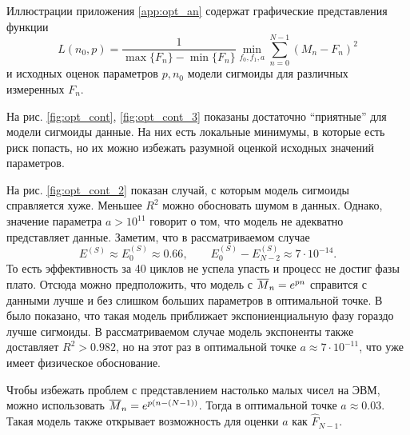 Иллюстрации приложения \ref{app:opt_an} содержат графические представления
функции
\begin{equation}\label{eq:opt_fun}
  L(n_0,p)=\frac{1}{\max\{F_{n}\}-\min\{F_{n}\}}\min_{f_0,f_1,a}
  \sum_{n=0}^{N-1}(M_{n}-F_{n})^{2}
\end{equation}
и исходных оценок параметров $p,n_0$ модели сигмоиды для различных измеренных
$F_{n}$.

На рис. \ref{fig:opt_cont}, \ref{fig:opt_cont_3} показаны достаточно
``приятные'' для модели сигмоиды данные. На них есть локальные минимумы, в
которые есть риск попасть, но их можно избежать разумной оценкой исходных
значений параметров.

На рис. \ref{fig:opt_cont_2} показан случай, с которым модель сигмоиды
справляется хуже. Меньшее $R^{2}$ можно обосновать шумом в данных. Однако,
значение параметра $a>10^{11}$ говорит о том, что модель не адекватно
представляет данные. Заметим, что в рассматриваемом случае
\[
  E^{(S)}\approx E^{(S)}_0\approx 0.66,\qquad
  E^{(S)}_{0}-E^{(S)}_{N-2}\approx 7\cdot 10^{-14}.
\]
То есть эффективность за 40 циклов не успела упасть и процесс не достиг фазы
плато. Отсюда можно предположить, что модель с $\overline{M}_{n}=e^{pn}$ справится с
данными лучше и без слишком больших параметров в оптимальной точке. В
\cite{zhaoComprehensiveAlgorithmQuantitative2005} было показано, что такая
модель приближает экспониенциальную фазу гораздо лучше сигмоиды. В
рассматриваемом случае модель экспоненты также доставляет $R^{2}>0.982$, но на
этот раз в оптимальной точке $a\approx 7\cdot 10^{-11}$, что уже имеет
физическое обоснование.

Чтобы избежать проблем с представлением настолько малых чисел на ЭВМ, можно
использовать $\overline{M}_{n}=e^{p(n-(N-1))}$. Тогда в оптимальной точке
$a\approx 0.03$. Такая модель также открывает возможность для оценки $a$ как
$\hat F_{N-1}$.

